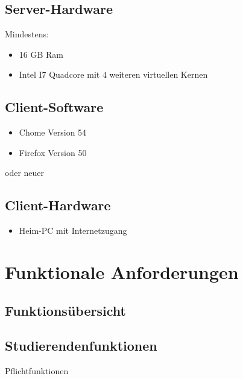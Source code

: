 \documentclass[parskip=full]{scrartcl}
\begin{document}
\subsection{Server-Hardware}
Mindestens:
\begin{itemize} 
  \item 16 GB Ram
  \item Intel I7 Quadcore mit 4 weiteren virtuellen Kernen 
\end{itemize}

\subsection{Client-Software}
\begin{itemize}
  \item Chome Version 54
  \item Firefox Version 50
\end{itemize}
oder neuer
\subsection{Client-Hardware}
\begin{itemize}
  \item Heim-PC mit Internetzugang
\end{itemize}
\section{Funktionale Anforderungen}

\subsection{Funktionsübersicht}

\subsection{Studierendenfunktionen}

Pflichtfunktionen
\end{document}
